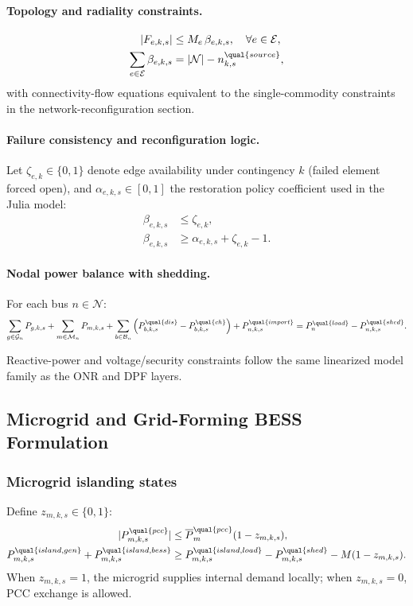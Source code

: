 \paragraph{Topology and radiality constraints.}
\begin{align}
|F_{e,k,s}| &\le M_e\,\beta_{e,k,s}, \quad \forall e\in\mathcal{E}, \\
\sum_{e\in\mathcal{E}} \beta_{e,k,s} &= |\mathcal{N}| - n^{\qual{source}}_{k,s},
\label{eq:radiality-constraint}
\end{align}
with connectivity-flow equations equivalent to the
single-commodity constraints in the network-reconfiguration section.

\paragraph{Failure consistency and reconfiguration logic.}
Let \(\zeta_{e,k}\in\{0,1\}\) denote edge availability under contingency \(k\)
(failed element forced open), and \(\alpha_{e,k,s}\in[0,1]\) the restoration
policy coefficient used in the Julia model:
\begin{align}
\beta_{e,k,s} &\le \zeta_{e,k}, \\
\beta_{e,k,s} &\ge \alpha_{e,k,s} + \zeta_{e,k} - 1.
\label{eq:beta-alpha-zeta}
\end{align}

\paragraph{Nodal power balance with shedding.}
For each bus \(n\in\mathcal{N}\):
\begin{align}
\sum_{g\in\mathcal{G}_n} P_{g,k,s}
+ \sum_{m\in\mathcal{M}_n} P_{m,k,s}
+ \sum_{b\in\mathcal{B}_n} \left(P_{b,k,s}^{\qual{dis}}-P_{b,k,s}^{\qual{ch}}\right)
+ P_{n,k,s}^{\qual{import}}
= P_{n}^{\qual{load}} - P^{\qual{shed}}_{n,k,s}.
\label{eq:nodal-balance-fmea}
\end{align}

Reactive-power and voltage/security constraints follow the same linearized
model family as the ONR and DPF layers.

\subsection{Microgrid and Grid-Forming BESS Formulation}

\subsubsection{Microgrid islanding states}
Define \(z_{m,k,s}\in\{0,1\}\):
\begin{align}
|P_{m,k,s}^{\qual{pcc}}| &\le \overline{P}_m^{\qual{pcc}}(1-z_{m,k,s}), \\
P_{m,k,s}^{\qual{island,gen}} + P_{m,k,s}^{\qual{island,bess}}
&\ge P_{m,k,s}^{\qual{island,load}} - P_{m,k,s}^{\qual{shed}} - M(1-z_{m,k,s}).
\end{align}
When \(z_{m,k,s}=1\), the microgrid supplies internal demand locally;
when \(z_{m,k,s}=0\), PCC exchange is allowed.

